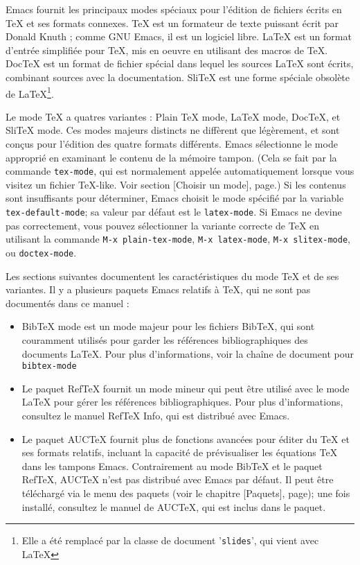 \newcommand{\tek}[1]{#1\TeX\xspace}

Emacs fournit les principaux modes spéciaux pour l'édition de fichiers
écrits en \TeX{} et ses formats connexes. \TeX{} est un formateur de
texte puissant écrit par Donald Knuth ; comme GNU Emacs, il est un
logiciel libre. \LaTeX{} est un format d'entrée simplifiée pour
\TeX{}, mis en oeuvre en utilisant des macros de \TeX{}. \tek{Doc} est
un format de fichier spécial dans lequel les sources \LaTeX{} sont
écrits, combinant sources avec la documentation. \tek{Sli} est une
forme spéciale obsolète de \LaTeX{}\footnote{Elle a été remplacé par
  la classe de document '\texttt{slides}', qui vient avec \LaTeX{}}.

Le mode \TeX{} a quatres variantes : Plain \TeX{} mode, \LaTeX{} mode,
\tek{Doc}, et \tek{Sli} mode. Ces modes majeurs distincts ne diffèrent
que légèrement, et sont conçus pour l'édition des quatre formats
différents. Emacs sélectionne le mode approprié en examinant le
contenu de la mémoire tampon. (Cela se fait par la commande
\texttt{tex-mode}, qui est normalement appelée automatiquement lorsque
vous visitez un fichier \TeX{}-like. Voir section
[Choisir un mode], page.) Si les contenus sont
insuffisants pour déterminer, Emacs choisit le mode spécifié par la
variable \texttt{tex-default-mode}; sa valeur par défaut est le
\texttt{latex-mode}. Si Emacs ne devine pas correctement, vous pouvez
sélectionner la variante correcte de \TeX{} en utilisant la commande
\texttt{M-x plain-tex-mode}, \texttt{M-x latex-mode}, \texttt{M-x
  slitex-mode}, ou \texttt{doctex-mode}. 

Les sections suivantes documentent les caractéristiques du mode \TeX{}
et de ses variantes. Il y a plusieurs paquets Emacs relatifs à \TeX{},
qui ne sont pas documentés dans ce manuel : 
\begin{itemize}
\item \tek{Bib} mode est un mode majeur pour les fichiers \tek{Bib},
  qui sont couramment utilisés pour garder les références
  bibliographiques des documents \LaTeX{}. Pour plus d'informations,
  voir la chaîne de document pour \texttt{bibtex-mode} 
\item Le paquet \tek{Ref} fournit un mode mineur qui peut être utilisé
  avec le mode \LaTeX{} pour gérer les références
  bibliographiques. Pour plus d'informations, consultez le manuel
  \tek{Ref} Info, qui est distribué avec Emacs.
\item Le paquet \tek{AUC} fournit plus de fonctions avancées pour
  éditer du \TeX{} et ses formats relatifs, incluant la capacité
  de prévisualiser les équations \TeX{} dans les tampons
  Emacs. Contrairement au mode \tek{Bib} et le paquet \tek{Ref},
  \tek{AUC} n'est pas distribué avec Emacs par défaut. Il peut être
  téléchargé via le menu des paquets (voir le chapitre
  [Paquets], page); une fois installé, consultez le manuel
  de \tek{AUC}, qui est inclus dans le paquet.
\end{itemize}


